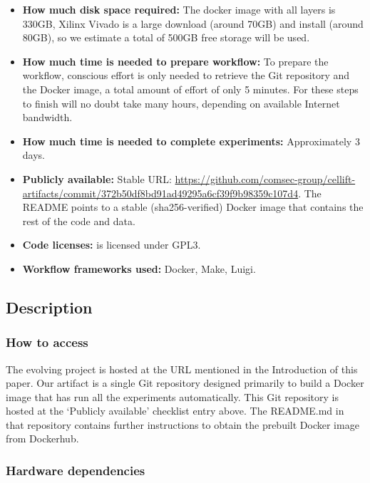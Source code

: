\documentclass[letterpaper,twocolumn,10pt]{article}
\begin{document}
{\begin{itemize}
  \item {\bf How much disk space required: } The docker image with all layers is 330GB, Xilinx Vivado is a large download (around 70GB) and install (around 80GB), so we estimate a total of 500GB free storage will be used.
  \item {\bf How much time is needed to prepare workflow: } To prepare the workflow, conscious effort is only needed to retrieve the Git repository and the Docker image, a total amount of effort of only 5 minutes. For these steps to finish will no doubt take many hours, depending on available Internet bandwidth.
  \item {\bf How much time is needed to complete experiments: } Approximately 3 days. 
  \item {\bf Publicly available: } Stable URL: \url{https://github.com/comsec-group/cellift-artifacts/commit/372b50df8bd91ad49295a6cf39f9b98359c107d4}. The README points to a stable (sha256-verified) Docker image that contains the rest of the code and data.
  \item {\bf Code licenses: } \ourname is licensed under GPL3. 
  \item {\bf Workflow frameworks used: } Docker, Make, Luigi. 
\end{itemize}

\subsection{Description}


\subsubsection{How to access}

The evolving project is hosted at the URL mentioned in the Introduction
of this paper. Our artifact is a single Git repository designed primarily to
build a Docker image that has run all the experiments automatically. This
Git repository is hosted at the `Publicly available' checklist entry above.
The README.md in that repository contains further instructions to obtain the
prebuilt Docker image from Dockerhub.

\subsubsection{Hardware dependencies}

}
\end{document}

